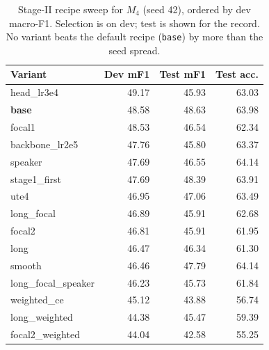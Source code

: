 \documentclass[sigconf,nonacm]{acmart}
\begin{document}
\begin{table}[t]
\centering
\caption{Stage-II recipe sweep for $M_4$ (seed 42), ordered by dev macro-F1. Selection is on dev; test is shown for the record. No variant beats the default recipe (\texttt{base}) by more than the seed spread.}
\label{tab:sweep}
\small
\begin{tabular}{lrrr}
\toprule
Variant & Dev mF1 & Test mF1 & Test acc. \\
\midrule
head\_lr3e4 & 49.17 & 45.93 & 63.03 \\
\textbf{base} & 48.58 & 48.63 & 63.98 \\
focal1 & 48.53 & 46.54 & 62.34 \\
backbone\_lr2e5 & 47.76 & 45.80 & 63.37 \\
speaker & 47.69 & 46.55 & 64.14 \\
stage1\_first & 47.69 & 48.39 & 63.91 \\
ute4 & 46.95 & 47.06 & 63.49 \\
long\_focal & 46.89 & 45.91 & 62.68 \\
focal2 & 46.81 & 45.91 & 61.95 \\
long & 46.47 & 46.34 & 61.30 \\
smooth & 46.46 & 47.79 & 64.14 \\
long\_focal\_speaker & 46.23 & 45.73 & 61.84 \\
weighted\_ce & 45.12 & 43.88 & 56.74 \\
long\_weighted & 44.38 & 45.47 & 59.39 \\
focal2\_weighted & 44.04 & 42.58 & 55.25 \\
\bottomrule
\end{tabular}
\end{table}
\end{document}
